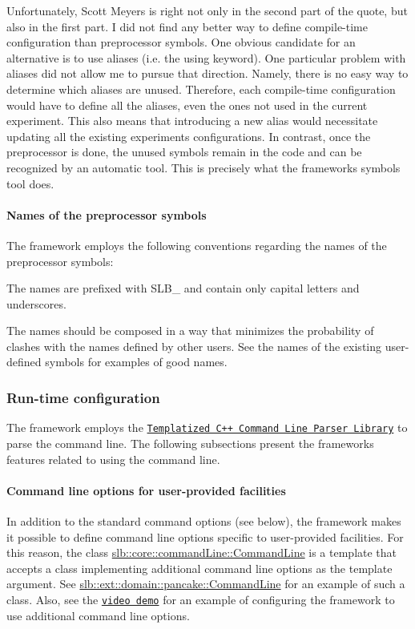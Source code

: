 Unfortunately, Scott Meyers is right not only in the second part of the quote, but also in the first part. I did not find any better way to define compile-\/time configuration than preprocessor symbols. One obvious candidate for an alternative is to use aliases (i.\+e. the {\ttfamily using} keyword). One particular problem with aliases did not allow me to pursue that direction. Namely, there is no easy way to determine which aliases are unused. Therefore, each compile-\/time configuration would have to define all the aliases, even the ones not used in the current experiment. This also means that introducing a new alias would necessitate updating all the existing experiments\textquotesingle{} configurations. In contrast, once the preprocessor is done, the unused symbols remain in the code and can be recognized by an automatic tool. This is precisely what the framework\textquotesingle{}s {\ttfamily symbols} tool does.\hypertarget{index_s-symbols-conventions}{}\paragraph{Names of the preprocessor symbols}\label{index_s-symbols-conventions}
The framework employs the following conventions regarding the names of the preprocessor symbols\+:
\begin{DoxyItemize}
\item The names are prefixed with {\ttfamily S\+L\+B\+\_\+} and contain only capital letters and underscores.
\item The names should be composed in a way that minimizes the probability of clashes with the names defined by other users. See the names of the existing user-\/defined symbols for examples of good names.
\end{DoxyItemize}\hypertarget{index_s-run-config}{}\subsubsection{Run-\/time configuration}\label{index_s-run-config}
The framework employs the \href{http://tclap.sourceforge.net/}{\tt Templatized C++ Command Line Parser Library} to parse the command line. The following subsections present the framework\textquotesingle{}s features related to using the command line.\hypertarget{index_s-user-cmd}{}\paragraph{Command line options for user-\/provided facilities}\label{index_s-user-cmd}
In addition to the standard command options (see below), the framework makes it possible to define command line options specific to user-\/provided facilities. For this reason, the class \hyperlink{structslb_1_1core_1_1commandLine_1_1CommandLine}{slb\+::core\+::command\+Line\+::\+Command\+Line} is a template that accepts a class implementing additional command line options as the template argument. See \hyperlink{structslb_1_1ext_1_1domain_1_1pancake_1_1CommandLine}{slb\+::ext\+::domain\+::pancake\+::\+Command\+Line} for an example of such a class. Also, see the \href{https://youtu.be/cElxLWve1Zw}{\tt video demo} for an example of configuring the framework to use additional command line options.

